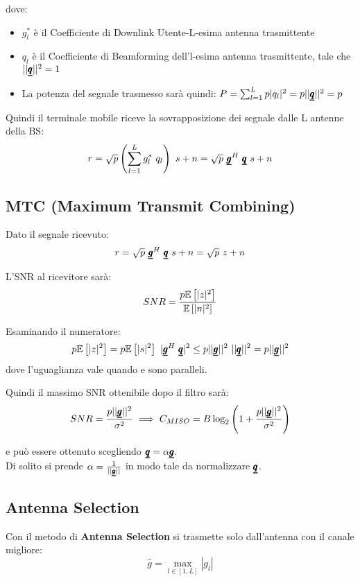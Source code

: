 dove:
\begin{itemize}
    \item $g_l^*$ è il Coefficiente di Downlink Utente-L-esima antenna trasmittente
    \item $q_l$ è il Coefficiente di Beamforming dell'l-esima antenna trasmittente, tale che $||\pmb{\underline{q}}||^2 = 1$
    \item La potenza del segnale trasmesso sarà quindi:  $P = \sum_{l=1}^{L} p |q_l|^2 = p ||\pmb{\underline{q}}||^2 = p$
\end{itemize}

Quindi il terminale mobile riceve la sovrapposizione dei segnale dalle L antenne della BS:
\begin{equation*}
    r = \sqrt{p} \left(\sum_{l=1}^{L} g_l^* \ q_l \right) \ s + n = \sqrt{p} \ \vc{g}^H \ \vc{q} \ s + n
\end{equation*}


\subsection{MTC (Maximum Transmit Combining)}
Dato il segnale ricevuto:
\begin{equation*}
    r = \sqrt{p} \ \vc{g}^H \ \vc{q} \ s + n = \sqrt{p}\ z + n
\end{equation*}

L'SNR al ricevitore sarà:
\begin{equation*}
    SNR = \frac{p\mathbb{E}\left[|z|^2\right]}{\mathbb{E}\left[|n|^2\right]}
\end{equation*}

Esaminando il numeratore:
\begin{equation*}
   p\av{|z|^2} = p\av{|s|^2} \ |\vc{g}^H \ \vc{q}|^2 \leq p ||\vc{g}||^2 \ ||\vc{q}||^2  = p ||\vc{g}||^2
\end{equation*}
dove l'uguaglianza vale quando  e  sono paralleli.

Quindi il massimo SNR ottenibile dopo il filtro sarà:
\begin{equation*}
    SNR = \frac{p ||\pmb{\underline{g}}||^2}{\sigma^2} \implies C_{MISO} = B\log_2\left(1 + \frac{p ||\pmb{\underline{g}}||^2}{\sigma^2}\right)
\end{equation*}

e può essere ottenuto scegliendo $\pmb{\underline{q}} = \alpha \pmb{\underline{g}}$. \\

Di solito si prende $\alpha = \frac{1}{||\pmb{\underline{g}}||}$ in modo tale da normalizzare $\pmb{\underline{q}}$.
\\

\subsection{Antenna Selection}
Con il metodo di \textbf{Antenna Selection} si trasmette solo dall'antenna con il canale migliore:
\begin{equation*}
    \hat{g} = \max_{l\in[1,L]} |g_l|
\end{equation*}


